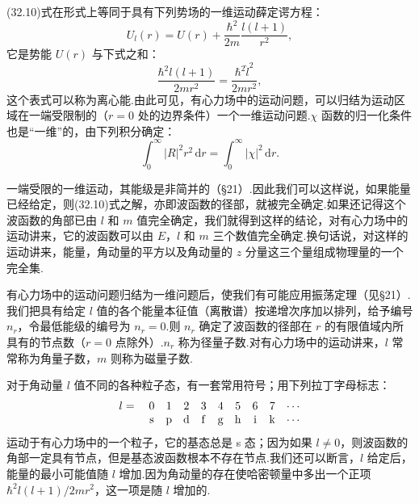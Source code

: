 (32.10)式在形式上等同于具有下列势场的一维运动薛定谔方程：
\begin{equation}
  U_l(r)=U(r)+\frac{\hbar^2}{2m}\frac{l(l+1)}{r^2},
\end{equation}
它是势能 $U(r)$ 与下式之和：
\begin{equation*}
  \frac{\hbar^2l(l+1)}{2mr^2}=\frac{\hbar^2\hat{l}^2}{2mr^2},
\end{equation*}
这个表式可以称为离心能.由此可见，有心力场中的运动问题，可以归结为运动区域在一端受限制的（$r=0$ 处的边界条件）一个一维运动问题.$\chi$ 函数的归一化条件也是“一维”的，由下列积分确定：
\begin{equation*}
  \int_0^{\infty}|R|^2r^2\,\mathrm{d}r=\int_0^{\infty}|\chi|^2\,\mathrm{d}r.
\end{equation*}

一端受限的一维运动，其能级是非简并的（§21）.因此我们可以这样说，如果能量已经给定，则(32.10)式之解，亦即波函数的径部，就被完全确定.如果还记得这个波函数的角部已由 $l$ 和 $m$ 值完全确定，我们就得到这样的结论，对有心力场中的运动讲来，它的波函数可以由 $E$，$l$ 和 $m$ 三个数值完全确定.换句话说，对这样的运动讲来，能量，角动量的平方以及角动量的 $z$ 分量这三个量组成物理量的一个完全集.

有心力场中的运动问题归结为一维问题后，使我们有可能应用振荡定理（见§21）.我们把具有给定 $l$ 值的各个能量本征值（离散谱）按递增次序加以排列，给予编号 $n_r$，令最低能级的编号为 $n_r=0$.则 $n_r$ 确定了波函数的径部在 $r$ 的有限值域内所具有的节点数（$r=0$ 点除外）.$n_r$ 称为径量子数.对有心力场中的运动讲来，$l$ 常常称为角量子数，$m$ 则称为磁量子数.

对于角动量 $l$ 值不同的各种粒子态，有一套常用符号；用下列拉丁字母标志：
\begin{equation}
\begin{array}{c*{9}{@{\quad}c}}
  l={}&0&1&2&3&4&5&6&7&\cdots\\
   &\mathrm{s}&\mathrm{p}&\mathrm{d}&\mathrm{f}&\mathrm{g}&\mathrm{h}&\mathrm{i}&\mathrm{k}&\cdots
\end{array}
\end{equation}
运动于有心力场中的一个粒子，它的基态总是 s 态；因为如果 $l\neq0$，则波函数的角部一定具有节点，但是基态波函数根本不存在节点.我们还可以断言，$l$ 给定后，能量的最小可能值随 $l$ 增加.因为角动量的存在使哈密顿量中多出一个正项 $\hbar^2l(l+1)/2mr^2$，这一项是随 $l$ 增加的.

